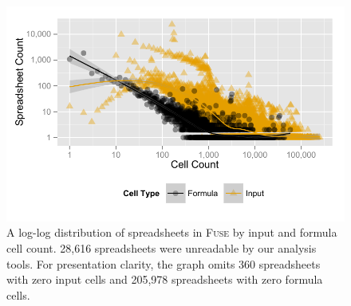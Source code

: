 \documentclass{svjour3}
\begin{document}
\begin{figure}
\centering
\includegraphics[width=0.85\columnwidth]{figures/cellcount}
\caption{
A log-log distribution of spreadsheets in \textsc{Fuse} by input and formula cell count. 28,616 spreadsheets were unreadable by our analysis tools. For presentation clarity, the graph omits 360 spreadsheets with zero input cells and 205,978 spreadsheets with zero formula cells.    
\label{fig:corpus_overview}}
\end{figure}







\end{document}
